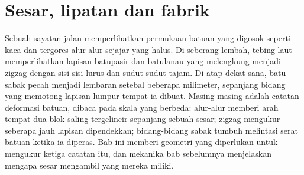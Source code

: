 \chapter{Sesar, lipatan dan fabrik}\label{ch:b1:faults-folds-fabrics}

Sebuah sayatan jalan memperlihatkan permukaan batuan yang digosok seperti kaca dan tergores alur-alur sejajar yang halus. Di seberang lembah, tebing laut memperlihatkan lapisan batupasir dan batulanau yang melengkung menjadi zigzag dengan sisi-sisi lurus dan sudut-sudut tajam. Di atap dekat sana, batu sabak pecah menjadi lembaran setebal beberapa milimeter, sepanjang bidang yang memotong lapisan lumpur tempat ia dibuat. Masing-masing adalah catatan deformasi batuan, dibaca pada skala yang berbeda: alur-alur memberi arah tempat dua blok saling tergelincir sepanjang sebuah sesar; zigzag mengukur seberapa jauh lapisan dipendekkan; bidang-bidang sabak tumbuh melintasi serat batuan ketika ia diperas. Bab ini memberi geometri yang diperlukan untuk mengukur ketiga catatan itu, dan mekanika bab sebelumnya menjelaskan mengapa sesar mengambil  yang mereka miliki.


